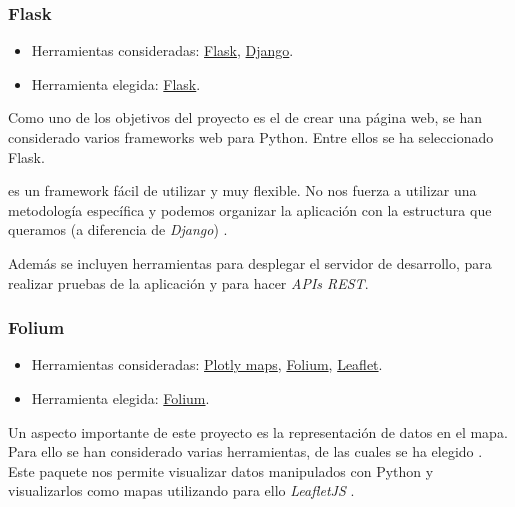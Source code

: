 \subsubsection{Flask}

\begin{itemize}
	\tightlist
	\item
	Herramientas consideradas:
	\href{http://flask.pocoo.org/}{Flask}, 
	\href{https://www.djangoproject.com/}{Django}.
	\item
	Herramienta elegida:
	\href{http://flask.pocoo.org/}{Flask}.
\end{itemize}

Como uno de los objetivos del proyecto es el de crear una página web, se han considerado varios frameworks web para Python. Entre ellos se ha seleccionado Flask.

 es un framework fácil de utilizar y muy flexible. No nos fuerza a utilizar una metodología específica y podemos organizar la aplicación con la estructura que queramos (a diferencia de \textit{Django}) \cite{book:flask}.

Además se incluyen herramientas para desplegar el servidor de desarrollo, para realizar pruebas de la aplicación y para hacer \textit{APIs REST}.

\subsubsection{Folium} \label{folium}

\begin{itemize}
	\tightlist
	\item
	Herramientas consideradas:
	\href{https://plot.ly/python/maps/}{Plotly maps}, 
	\href{http://python-visualization.github.io/folium/}{Folium},
	\href{https://leafletjs.com/}{Leaflet}.
	\item
	Herramienta elegida:
	\href{http://python-visualization.github.io/folium/}{Folium}.
\end{itemize}

Un aspecto importante de este proyecto es la representación de datos en el mapa. \\

Para ello se han considerado varias herramientas, de las cuales se ha elegido  \cite{docs:folium}. Este paquete nos permite visualizar datos manipulados con Python y visualizarlos como mapas utilizando para ello \textit{LeafletJS} \cite{docs:leaflet}.

